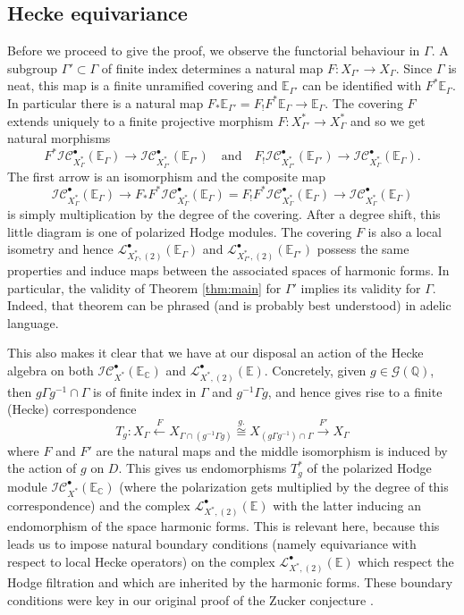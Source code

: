 \documentclass[12pt,letterpaper]{amsart}
\numberwithin{equation}{section}
\def\CC{{\mathbb C}}
\def\EE{{\mathbb E}}
\def\QQ{{\mathbb Q}}
\def\G{\Gamma}
\def\Gcal{{\mathcal G}}
\def\Iscr{{\mathscr I}}
\def\Lscr{{\mathscr L}}
\def\Cscr{{\mathscr C}}
\def\pt{{\scriptscriptstyle\bullet}}
\theoremstyle{remark}
\begin{document}
\subsection{Hecke equivariance} Before we proceed to give the proof, we observe the functorial behaviour in  $\G$.  A subgroup $\G'\subset \G$ of finite index determines  a natural  map $F: X_{\G'} \to X_\G$. Since $\G$ is neat, this map is a finite unramified covering  and $\EE_{\G'}$ can be identified with $F^*\EE_\G$. In particular 
there is a natural map $F_*\EE_{\G'}=F_! F^*\EE_{\G}\to \EE_{\G}$. The covering $F$ extends uniquely  to a finite projective morphism $F: X^*_{\G'} \to X^*_\G$ and so we get natural morphisms
\[
F^*\Iscr\Cscr^\pt_{X_\G^*}(\EE_\G)\to \Iscr\Cscr^\pt_{X_{\G'}^*}(\EE_{\G'}) \quad \text{and}\quad 
F_!\Iscr\Cscr^\pt_{X_{\G'}^*}(\EE_{\G'})\to \Iscr\Cscr^\pt_{X_\G^*}(\EE_\G).
\]
The first arrow is an isomorphism and the composite  map
\[
\Iscr\Cscr^\pt_{X_\G^*}(\EE_\G)\to F_*F^*\Iscr\Cscr^\pt_{X_\G^*}(\EE_\G)=F_!F^*\Iscr\Cscr^\pt_{X_\G^*}(\EE_\G)\to \Iscr\Cscr^\pt_{X_\G^*}(\EE_\G)
\]
is simply multiplication by the degree of the covering. After a degree shift, this  little diagram is  one of polarized Hodge modules.
The covering $F$ is also a local isometry and hence $\Lscr^\pt_{{X_\G^*},(2)}(\EE_\G)$ and
$\Lscr^\pt_{{X_{\G'}^*},(2)}(\EE_{\G'})$ possess the same  properties  and induce maps between the associated  spaces of harmonic forms. In particular, the validity of  Theorem \ref{thm:main} for $\G'$ implies its validity  for $\G$. Indeed, that  theorem  can be phrased 
(and is probably   best understood) in  adelic language. 

This also makes it clear 
that  we have at our disposal an action of the Hecke algebra on both  $\Iscr\Cscr_{X^*}^\pt(\EE_\CC)$ and  $\Lscr^\pt_{{X^*},(2)}(\EE)$.   Concretely, given $g\in \Gcal(\QQ)$, then $g\G g^{-1}\cap \G$ is of finite index in 
$\G$ and $g^{-1}\G g$,  and hence gives rise to a finite (Hecke) correspondence
\[
T_g: X_\G\xleftarrow{F} X_{\G\cap (g^{-1}\G g)} \stackrel{g.}{\cong}X_{(g\G g^{-1})\cap \G}\xrightarrow{F'} X_\G
\]
where $F$  and $F'$ are  the natural maps and  the middle isomorphism is induced by the action of $g$ on $D$. This  gives 
us endomorphisms $T_g^*$  of the polarized Hodge module $\Iscr\Cscr_{X^*}^\pt(\EE_\CC)$ (where the polarization gets multiplied by 
 the degree of this correspondence) and  the  complex $\Lscr^\pt_{{X^*},(2)}(\EE)$ with the latter inducing an  endomorphism of the space  harmonic forms. 
 This is relevant here, because this leads us  to impose natural boundary  conditions (namely equivariance with 
 respect to local Hecke operators) on the complex $\Lscr^\pt_{{X^*},(2)}(\EE)$  which respect the Hodge filtration and which are inherited by the harmonic forms.  These boundary conditions  were key in our original proof of the Zucker conjecture \cite{looij:l2}. 
\end{document}
